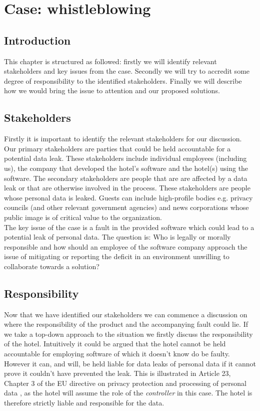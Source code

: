 \chapter{Case: whistleblowing}\label{ch:whistleblowing}
\label{chap:whistleblowing}
\section{Introduction}
This chapter is structured as followed: firstly we will identify relevant stakeholders and key issues from the case. Secondly we will try to accredit some degree of responsibility to the identified stakeholders. Finally we will describe how we would bring the issue to attention and our proposed solutions.

\section{Stakeholders}
Firstly it is important to identify the relevant stakeholders for our discussion. Our primary stakeholders are parties that could be held accountable for a potential data leak. These stakeholders include individual employees (including us), the company that developed the hotel's software and the hotel(s) using the software.  The secondary stakeholders are people that are are affected by a data leak or that are otherwise involved in the process. These stakeholders are people whose personal data is leaked. Guests can include high-profile bodies e.g. privacy councils (and other relevant government agencies) and news corporations whose public image is of critical value to the organization.\\
The key issue of the case is a fault in the provided software which could lead to a potential leak of personal data. The question is: Who is legally or morally responsible and how should an employee of the software company approach the issue of mitigating or reporting the deficit in an environment unwilling to collaborate towards a solution?

\section{Responsibility}
Now that we have identified our stakeholders we can commence a discussion on where the responsibility of the product and the accompanying fault could lie. If we take a top-down approach to the situation we firstly discuss the responsibility of the hotel. Intuitively it could be argued that the hotel cannot be held accountable for employing software of which it doesn't know do be faulty. However it can, and will, be held liable for data leaks of personal data if it cannot prove it couldn't have prevented the leak. This is illustrated in Article 23, Chapter 3 of the EU directive on privacy protection and processing of personal data \cite{privacy_directive}, as the hotel will assume the role of the \textit{controller} in this case. The hotel is therefore strictly liable and responsible for the data.

